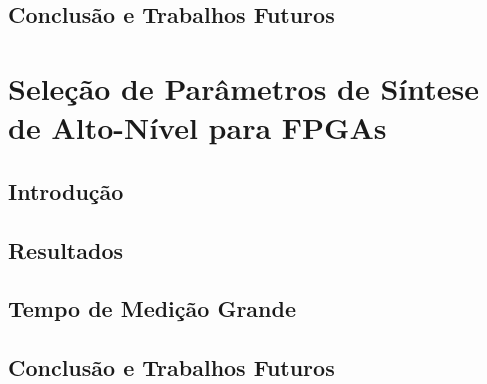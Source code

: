 \subsection{Conclusão e Trabalhos Futuros}
\label{subsec:CLconcl}

\section{Seleção de Parâmetros de Síntese de Alto-Nível para FPGAs}
\label{sec:paramSelFPGA}

\subsection{Introdução}
\label{subsec:FPGAintro}

\subsection{Resultados}
\label{subsec:FPGAres}

\subsection{Tempo de Medição Grande}
\label{subsec:bigtime}

\subsection{Conclusão e Trabalhos Futuros}
\label{subsec:FPGAconcl}
